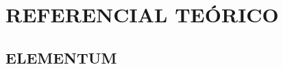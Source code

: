 \section{REFERENCIAL TEÓRICO}

\begin{onehalfspace}
  \lipsum[7]
\end{onehalfspace}

\subsection{ELEMENTUM}

\begin{onehalfspace}
  \lipsum[8]

  \begin{adjustwidth}{4cm}{}
    \begin{singlespace}
      \footnotesize{\lipsum[9]}
    \end{singlespace}
  \end{adjustwidth}

  \lipsum[10]
\end{onehalfspace}
